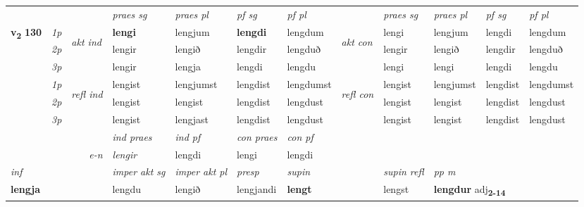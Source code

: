 \begin{longtable}[l]{X>{\footnotesize\itshape}llXXXXlXXXX}
 & &   & \textit{praes sg}  & \textit{praes pl}    & \textit{ pf sg} & \textit{pf pl} & & \textit{praes sg}  & \textit{praes pl}    & \textit{pf sg} & \textit{pf pl }  \\ \cmidrule{4-7} \cmidrule{9-12}
 \multirow{2}{*}{{{\textbf{v{\textsubscript{2}}} \Large{\textbf{130}}}}}  & 1p & \multirow{3}{*}{\begin{turn}{90}\textit{akt ind}\end{turn}} & \textbf{lengi} & lengjum & \textbf{lengdi} & lengdum & \multirow{3}{*}{\begin{turn}{90}\textit{akt con}\end{turn}} &lengi & lengjum & lengdi & lengdum\\*
 & 2p &  &  lengir  & lengið & lengdir & lengduð & & lengir & lengið & lengdir & lengduð \\*
 & 3p &  & lengir & lengja & lengdi & lengdu & & lengi & lengi& lengdi & lengdu \\*
\cmidrule{4-7} \cmidrule{9-12}
 & 1p & \multirow{3}{*}{\begin{turn}{90}\textit{refl ind}\end{turn}}  & lengist & lengjumst & lengdist & lengdumst & \multirow{3}{*}{\begin{turn}{90}\textit{refl con}\end{turn}}  &lengist & lengjumst & lengdist & lengdumst \\*
 & 2p &  & lengist & lengist & lengdist & lengdust & &lengist & lengist & lengdist & lengdust \\*
 & 3p  & & lengist & lengjast & lengdist & lengdust & & lengist & lengist& lengdist & lengdust \\*
\cmidrule{4-7} \cmidrule{9-12}

   && &  \textit{ind praes} & \textit{ind pf} & \textit{con praes} & \textit{con pf} \\*
\multicolumn{3}{r}{\textit{e-n}} & lengir & lengdi & lengi & lengdi \\*

\cmidrule{4-7}
   {\textit{inf}} & &  & \textit{imper akt sg} & \textit{imper akt pl}   & \textit{presp} & \textit{supin} && \textit{supin refl} & \textit{pp m} \\*
  {\textbf{lengja}} & && lengdu  & lengið   & lengjandi &  \textbf{lengt} && lengst & \multicolumn{2}{l}{\textbf{lengdur} adj\textbf{\textsubscript{2-14}}} \\*

\midrule


\end{longtable}
